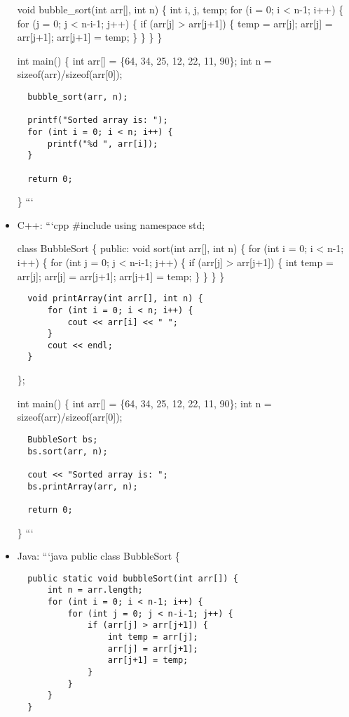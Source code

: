 \documentclass[
  letterpaper,
]{scrbook}
\begin{document}
\begin{itemize}
  void bubble\_sort(int arr{[}{]}, int n) \{ int i, j, temp; for (i = 0;
  i \textless{} n-1; i++) \{ for (j = 0; j \textless{} n-i-1; j++) \{ if
  (arr{[}j{]} \textgreater{} arr{[}j+1{]}) \{ temp = arr{[}j{]};
  arr{[}j{]} = arr{[}j+1{]}; arr{[}j+1{]} = temp; \} \} \} \}

  int main() \{ int arr{[}{]} = \{64, 34, 25, 12, 22, 11, 90\}; int n =
  sizeof(arr)/sizeof(arr{[}0{]});

\begin{verbatim}
  bubble_sort(arr, n);

  printf("Sorted array is: ");
  for (int i = 0; i < n; i++) {
      printf("%d ", arr[i]);
  }

  return 0;
\end{verbatim}

  \} ```
\item
  C++: ```cpp \#include using namespace std;

  class BubbleSort \{ public: void sort(int arr{[}{]}, int n) \{ for
  (int i = 0; i \textless{} n-1; i++) \{ for (int j = 0; j \textless{}
  n-i-1; j++) \{ if (arr{[}j{]} \textgreater{} arr{[}j+1{]}) \{ int temp
  = arr{[}j{]}; arr{[}j{]} = arr{[}j+1{]}; arr{[}j+1{]} = temp; \} \} \}
  \}

\begin{verbatim}
  void printArray(int arr[], int n) {
      for (int i = 0; i < n; i++) {
          cout << arr[i] << " ";
      }
      cout << endl;
  }
\end{verbatim}

  \};

  int main() \{ int arr{[}{]} = \{64, 34, 25, 12, 22, 11, 90\}; int n =
  sizeof(arr)/sizeof(arr{[}0{]});

\begin{verbatim}
  BubbleSort bs;
  bs.sort(arr, n);

  cout << "Sorted array is: ";
  bs.printArray(arr, n);

  return 0;
\end{verbatim}

  \} ```
\item
  Java: ```java public class BubbleSort \{

\begin{verbatim}
  public static void bubbleSort(int arr[]) {
      int n = arr.length;
      for (int i = 0; i < n-1; i++) {
          for (int j = 0; j < n-i-1; j++) {
              if (arr[j] > arr[j+1]) {
                  int temp = arr[j];
                  arr[j] = arr[j+1];
                  arr[j+1] = temp;
              }
          }
      }
  }


\end{verbatim}
\end{itemize}
\end{document}
